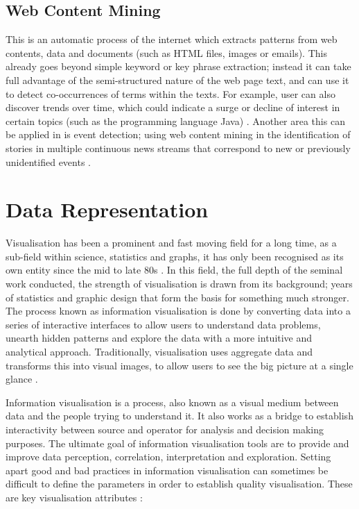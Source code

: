 \subsection{Web Content Mining}

This is an automatic process of the internet which extracts patterns from web contents, data and documents (such as HTML files, images or emails). This already goes beyond simple keyword or key phrase extraction; instead it can take full advantage of the semi-structured nature of the web page text, and can use it to detect co-occurrences of terms within the texts. For example, user can also discover  trends over time, which could indicate a surge or decline of interest in certain topics (such as the programming language Java) \cite{mobasher2000integrating}. Another area this can be applied in is event detection; using web content mining in the identification of stories in multiple continuous news streams that correspond to new or previously unidentified events \cite{yadav2015web}. 

\section{Data Representation}

Visualisation has been a prominent and fast moving field for a long time, as a sub-field within science, statistics and graphs, it has only been recognised as its own entity since the mid to late 80s \cite{wilkinson2009history}. In this field, the full depth of the seminal work conducted, the strength of visualisation is drawn from its background; years of statistics and graphic design that form the basis for something much stronger. The process known as information visualisation is done by converting data into a series of interactive interfaces to allow users to understand data problems, unearth hidden patterns and explore the data with a more intuitive and analytical approach. Traditionally, visualisation uses aggregate data and transforms this into visual images, to allow users to see the big picture at a single glance \cite{chen1999information}.

Information visualisation is a process, also known as a visual medium between data and the people trying to understand it. It also works as a bridge to establish interactivity between source and operator for analysis and decision making purposes. The ultimate goal of information visualisation tools are to provide and improve data perception, correlation, interpretation and exploration. Setting apart good and bad practices in information visualisation can sometimes be difficult to define the parameters in order to establish quality visualisation. These are key visualisation attributes \cite{carr1999guidelines}:

